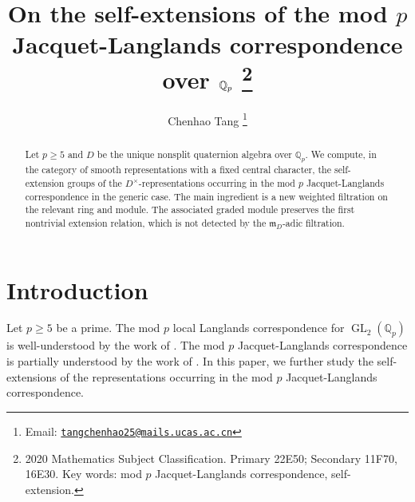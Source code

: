 \documentclass[11pt,a4paper]{article} %
\title{On the self-extensions of the mod $p$ Jacquet-Langlands correspondence over $\Qp$%
\thanks{2020 Mathematics Subject Classification.
Primary 22E50; Secondary 11F70, 16E30.
\newline
Key words: mod $p$ Jacquet-Langlands correspondence, self-extension.}}
\author{Chenhao Tang%
\thanks{Email:
\href{mailto:tangchenhao25@mails.ucas.ac.cn}
{\nolinkurl{tangchenhao25@mails.ucas.ac.cn}}}}
\date{}
\def\GL{\operatorname{GL}}
\def\Qp{\mathbb{Q}_p}
\begin{document}
\newtheorem{definition}{Definition}[section] %
\newtheorem{remark}[definition]{Remark}
\newtheorem{example}[definition]{Example}
\newtheorem{proposition}[definition]{Proposition}
\newtheorem{lemma}[definition]{Lemma}
\newtheorem{corollary}[definition]{Corollary}
\newtheorem{theorem}[definition]{Theorem}
\newtheorem{conjecture}[definition]{Conjecture}

\maketitle

\begin{abstract}
   Let $p\ge5$ and $D$ be the unique nonsplit quaternion algebra over $\Qp$. We compute, in the category of smooth representations with a fixed central character, the self-extension groups of the $D^{\times}$-representations occurring in the mod $p$ Jacquet-Langlands correspondence in the generic case. The main ingredient is a new weighted filtration on the relevant ring and module. The associated graded module preserves the first nontrivial extension relation, which is not detected by the $\mathfrak m_D$-adic filtration.
\end{abstract}

\tableofcontents

\section{Introduction}

Let $p\ge5$ be a prime. The mod $p$ local Langlands correspondence for $\GL_2(\Qp)$ is well-understood by the work of \cite{Bre03,Col10,Eme11,Pas13}. The mod $p$ Jacquet-Langlands correspondence is partially understood by the work of \cite{Sch18,Lud17,Pas22,HW24a,HW24b}. In this paper, we further study the self-extensions of the representations occurring in the mod $p$ Jacquet-Langlands correspondence.
\end{document}
